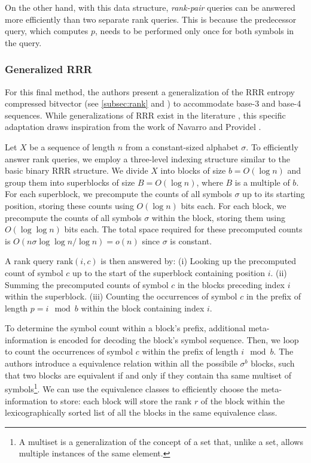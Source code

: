 \noindent On the other hand, with this data structure, \emph{rank-pair} queries can be answered more efficiently than two separate rank queries. This is because the predecessor query, which computes \(p\), needs to be performed only once for both symbols in the query.


\subsubsection{Generalized RRR}

For this final method, the authors present a generalization of the RRR entropy compressed bitvector (see \autoref{subsec:rank} and \cite{RRR2002}) to accommodate base-3 and base-4 sequences. While generalizations of RRR exist in the literature \cite{ferragina2007compressed}, this specific adaptation draws inspiration from the work of Navarro and Providel \cite{navarro2012fast}. \vspace{0.4cm}

\noindent Let \(X\) be a sequence of length \(n\) from a constant-sized alphabet \(\sigma\). To efficiently answer rank queries, we employ a three-level indexing structure similar to the basic binary RRR structure. We divide \(X\) into blocks of size \(b = O(\log n)\) and group them into superblocks of size \(B = O(\log n)\), where \(B\) is a multiple of \(b\). For each superblock, we precompute the counts of all symbols \(\sigma\) up to its starting position, storing these counts using \(O(\log n)\) bits each. For each block, we precompute the counts of all symbols \(\sigma\) within the block, storing them using \(O(\log \log n)\) bits each. The total space required for these precomputed counts is \(O(n \sigma \log \log n / \log n) = o(n)\) since \(\sigma\) is constant. \vspace{0.4cm}

\noindent A rank query \(\textrm{rank}(i, c)\) is then answered by: (i) Looking up the precomputed count of symbol \(c\) up to the start of the superblock containing position \(i\). (ii) Summing the precomputed counts of symbol \(c\) in the blocks preceding index \(i\) within the superblock. (iii) Counting the occurrences of symbol \(c\) in the prefix of length \(p = i \mod b\) within the block containing index \(i\). \vspace{0.4cm}


\noindent To determine the symbol count within a block's prefix, additional meta-information is encoded for decoding the block's symbol sequence. Then, we loop to count the occurrences of symbol \(c\) within the prefix of length $i \mod b$. The authors introduce a equivalence relation within all the possibile $\sigma^b$ blocks, such that two blocks are equivalent if and only if they contain tha same multiset of symbols\footnote{A multiset is a generalization of the concept of a set that, unlike a set, allows multiple instances of the same element.}. We can use the equivalence classes to efficiently choose the meta-information to store: each block will store the rank $r$ of the block within the lexicographically sorted list of all the blocks in the same equivalence class.

